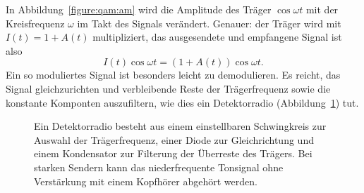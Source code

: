 In Abbildung~\ref{figure:qam:am} wird die Amplitude des Träger
$\cos\omega t$ mit der Kreisfrequenz $\omega$ im Takt des
Signals verändert.
Genauer: der Träger wird mit $I(t)=1+A(t)$ multipliziert,
das ausgesendete und empfangene Signal ist also
\begin{equation}
I(t) \cos\omega t
=
(1+A(t)) \cos\omega t.
\label{qam:eqn:am}
\end{equation}
Ein so moduliertes Signal ist besonders leicht zu demodulieren.
Es reicht, das Signal gleichzurichten und verbleibende Reste
der Trägerfrequenz sowie die konstante Komponten auszufiltern, wie
dies ein Detektorradio (Abbildung~\ref{figure:qam:detektor}) tut.
\begin{figure}
\centering
{}
\caption{Ein Detektorradio besteht aus einem einstellbaren
Schwingkreis zur Auswahl der Trägerfrequenz, einer Diode zur
Gleichrichtung und einem Kondensator zur Filterung der Überreste
des Trägers.
Bei starken Sendern kann das niederfrequente Tonsignal ohne
Verstärkung mit einem Kopfhörer abgehört werden.
\label{figure:qam:detektor}}
\end{figure}

